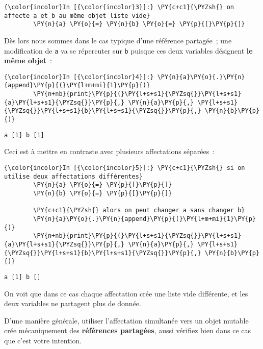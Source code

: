     \begin{Verbatim}[commandchars=\\\{\}]
{\color{incolor}In [{\color{incolor}3}]:} \PY{c+c1}{\PYZsh{} on affecte a et b au même objet liste vide}
        \PY{n}{a} \PY{o}{=} \PY{n}{b} \PY{o}{=} \PY{p}{[}\PY{p}{]}
\end{Verbatim}


    Dès lors nous sommes dans le cas typique d'une référence partagée~; une
modification de \texttt{a} va se répercuter sur \texttt{b} puisque ces
deux variables désignent \textbf{le même objet}~:

    \begin{Verbatim}[commandchars=\\\{\}]
{\color{incolor}In [{\color{incolor}4}]:} \PY{n}{a}\PY{o}{.}\PY{n}{append}\PY{p}{(}\PY{l+m+mi}{1}\PY{p}{)}
        \PY{n+nb}{print}\PY{p}{(}\PY{l+s+s1}{\PYZsq{}}\PY{l+s+s1}{a}\PY{l+s+s1}{\PYZsq{}}\PY{p}{,} \PY{n}{a}\PY{p}{,} \PY{l+s+s1}{\PYZsq{}}\PY{l+s+s1}{b}\PY{l+s+s1}{\PYZsq{}}\PY{p}{,} \PY{n}{b}\PY{p}{)}
\end{Verbatim}


    \begin{Verbatim}[commandchars=\\\{\}]
a [1] b [1]

    \end{Verbatim}

    Ceci est à mettre en contraste avec plusieurs affectations séparées~:

    \begin{Verbatim}[commandchars=\\\{\}]
{\color{incolor}In [{\color{incolor}5}]:} \PY{c+c1}{\PYZsh{} si on utilise deux affectations différentes}
        \PY{n}{a} \PY{o}{=} \PY{p}{[}\PY{p}{]}
        \PY{n}{b} \PY{o}{=} \PY{p}{[}\PY{p}{]}
        
        \PY{c+c1}{\PYZsh{} alors on peut changer a sans changer b}
        \PY{n}{a}\PY{o}{.}\PY{n}{append}\PY{p}{(}\PY{l+m+mi}{1}\PY{p}{)}
        \PY{n+nb}{print}\PY{p}{(}\PY{l+s+s1}{\PYZsq{}}\PY{l+s+s1}{a}\PY{l+s+s1}{\PYZsq{}}\PY{p}{,} \PY{n}{a}\PY{p}{,} \PY{l+s+s1}{\PYZsq{}}\PY{l+s+s1}{b}\PY{l+s+s1}{\PYZsq{}}\PY{p}{,} \PY{n}{b}\PY{p}{)}
\end{Verbatim}


    \begin{Verbatim}[commandchars=\\\{\}]
a [1] b []

    \end{Verbatim}

    On voit que dans ce cas chaque affectation crée une liste vide
différente, et les deux variables ne partagent plus de donnée.

    D'une manière générale, utiliser l'affectation simultanée vers un objet
mutable crée mécaniquement des \textbf{références partagées}, aussi
vérifiez bien dans ce cas que c'est votre intention.